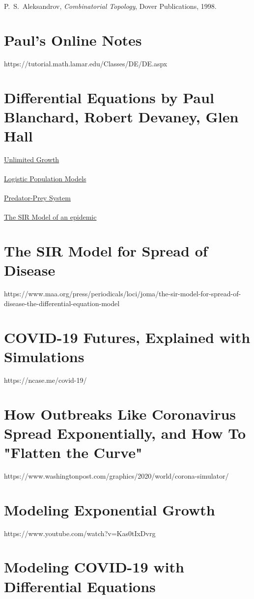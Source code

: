 \documentclass{amsart}
\theoremstyle{definition}
\numberwithin{equation}{section}
\begin{document}
\begin{sansmath}
\begin{thebibliography}{12}
 \smallskip

    P.~S.~Aleksandrov, {\it Combinatorial Topology},
    Dover Publications, 1998.


\end{thebibliography}


\newpage
\section{Paul's Online Notes}
https://tutorial.math.lamar.edu/Classes/DE/DE.aspx\\
\lipsum[0-2]

\section{Differential Equations by Paul Blanchard, Robert Devaney, Glen Hall}
\underline{Unlimited Growth}\\ %
\lipsum[2-4]\\
\underline{Logistic Population Models}\\ %
\lipsum[4-6]\\
\underline{Predator-Prey System}\\ %
\lipsum[6-8]\\
\underline{The SIR Model of an epidemic}\\ %
\lipsum[8-10]

\section{The SIR Model for Spread of Disease}
https://www.maa.org/press/periodicals/loci/joma/the-sir-model-for-spread-of-disease-the-differential-equation-model\\
\lipsum[0-2]

\section{COVID-19 Futures, Explained with Simulations}
https://ncase.me/covid-19/\\
\lipsum[3-5]

\section{How Outbreaks Like Coronavirus Spread Exponentially, and How To "Flatten the Curve"}
https://www.washingtonpost.com/graphics/2020/world/corona-simulator/\\
\lipsum[1-3]

\section{Modeling Exponential Growth}
https://www.youtube.com/watch?v=Kas0tIxDvrg\\
\lipsum[2-3]

\section{Modeling COVID-19 with Differential Equations}
\lipsum[3-4]
\end{sansmath}
\end{document}
